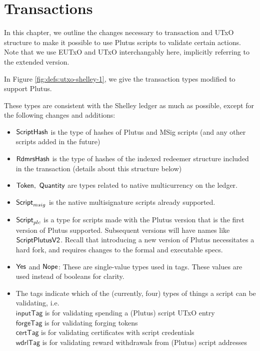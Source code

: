 \section{Transactions}
\label{sec:transactions}

In this chapter, we outline the changes necessary to transaction and
UTxO structure to make it possible to use Plutus scripts to validate
certain actions. Note that we use EUTxO and UTxO interchangably here,
implicitly referring to the extended version.

In Figure \ref{fig:defs:utxo-shelley-1}, we give the transaction types modified
to support Plutus.

These types are consistent with the Shelley ledger
as much as possible,
except for the following changes and additions:

\begin{itemize}
  \item $\mathsf{ScriptHash}$ is the type of hashes
  of Plutus and MSig scripts (and any other scripts added in the future)

  \item $\mathsf{RdmrsHash}$ is the type of hashes of the indexed redeemer structure
  included in the transaction (details about this structure below)

  \item $\mathsf{Token},~\mathsf{Quantity}$ are types
  related to native multicurrency on the ledger.

  \item  $\mathsf{Script}_{msig}$ is the native multisignature scripts already supported.

  \item $\mathsf{Script}_{plc}$ is a type for scripts made with the Plutus version
  that is the first version of Plutus supported. Subsequent versions will
  have names like $\mathsf{ScriptPlutusV2}$. Recall that introducing
  a new version of Plutus necessitates a hard fork, and requires changes
  to the formal and executable specs.

  \item $\mathsf{Yes}$ and $\mathsf{Nope}$: These are single-value types used in tags. These
  values are used instead of booleans for clarity.

  \item The tags indicate which of the (currently, four) types of things a script
  can be validating, i.e. \\
  $\mathsf{inputTag}$ is for validating spending a (Plutus) script UTxO entry \\
  $\mathsf{forgeTag}$ is for validating forging tokens \\
  $\mathsf{certTag}$  is for validating certificates with script credentials  \\
  $\mathsf{wdrlTag}$ is for validating reward withdrawals from (Plutus) script addresses


\end{itemize}
